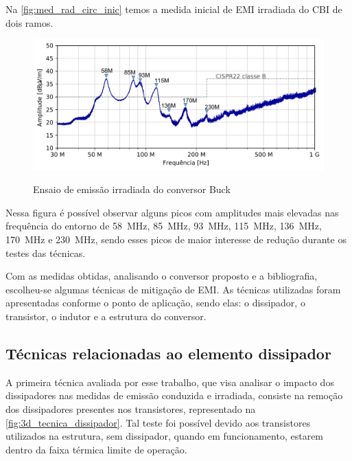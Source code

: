     Na \autoref{fig:med_rad_circ_inic} temos a medida inicial de EMI irradiada do CBI de dois ramos. 
    
    \begin{figure}[H]
    	\centering
    	\caption{Ensaio de emissão irradiada do conversor Buck \Interleaved}
    	\includegraphics[scale=.9]{pdf/rad/Circuito inicial_2.pdf}
    	\label{fig:med_rad_circ_inic}
    \end{figure}
    
    Nessa figura é possível observar alguns picos com amplitudes mais elevadas nas frequência do entorno de \SI{58}{\mega\hertz}, \SI{85}{\mega\hertz}, \SI{93}{\mega\hertz}, \SI{115}{\mega\hertz}, \SI{136}{\mega\hertz}, \SI{170}{\mega\hertz} e \SI{230}{\mega\hertz}, sendo esses picos de maior interesse de redução durante os testes das técnicas.
    
    Com as medidas obtidas, analisando o conversor proposto e a bibliografia, escolheu-se algumas técnicas de mitigação de EMI. As técnicas utilizadas foram apresentadas conforme o ponto de aplicação, sendo elas: o dissipador, o transistor, o indutor e a estrutura do conversor. 
    
    \subsection{Técnicas relacionadas ao elemento dissipador} \label{cap:result_tecnicas_dissip}
    
    A primeira técnica avaliada por esse trabalho, que visa analisar o impacto dos dissipadores nas medidas de emissão conduzida e irradiada, consiste na remoção dos dissipadores presentes nos transistores, representado na \autoref{fig:3d_tecnica_dissipador}. Tal teste foi possível devido aos transistores utilizados na estrutura, sem dissipador, quando em funcionamento, estarem dentro da faixa térmica limite de operação. 
    

